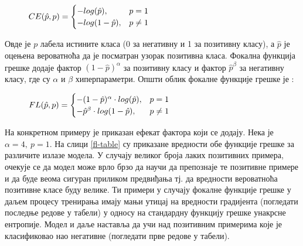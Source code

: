 \documentclass[11pt,oneside]{memoir}
\begin{document}
\begin{figure}[H]
  \centering
  $ CE(\hat{p}, p) =
  \begin{cases}
    \centering
    -log(\hat{p}), & p = 1 \\
    -log(1-\hat{p}), & p \neq 1
  \end{cases}
  $
\end{figure}

Овде је $p$ лабела истините класа (0 за негативну и 1 за позитивну класу), а $\hat{p}$ је оцењена вероватноћа да је посматран узорак позитивна класа.
Фокална функција грешке додаје фактор $(1 - \hat{p})^{\alpha}$ за позитивну класу и фактор $\hat{p}^{\beta}$
за негативну класу, где су $\alpha$ и $\beta$ хиперпараметри. Општи облик фокалне функције грешке је \cite{focal_loss}:

\begin{figure}[H]
  \centering
  $ FL(\hat{p}, p) =
  \begin{cases}
    \centering
    -(1 - \hat{p})^{\alpha}\cdot log(\hat{p}) , & p = 1 \\
    -\hat{p}^{\beta}\cdot log(1-\hat{p}), & p \neq 1
  \end{cases}
  $
\end{figure}

На конкретном примеру је приказан ефекат фактора који се додају. Нека је $\alpha = 4,\ p = 1$. На слици \ref{fl-table} су приказане
вредности обе функције грешке за различите излазе модела. У случају великог броја лаких позитивних примера, очекује се да модел 
може врло брзо да научи да препознаје те позитивне примере и да буде веома сигуран приликом предвиђања тј. да вредности 
вероватноћа позитивне класе буду велике. Ти примери у случају фокалне функције грешке у даљем процесу тренирања имају мањи утицај
на вредности градијента (погледати последње редове у табели) у односу на стандардну функцију грешке унакрсне ентропије. 
Модел и даље наставља да учи над позитивним примерима које је класификовао нао негативне (погледати прве редове у табели).
\end{document}
